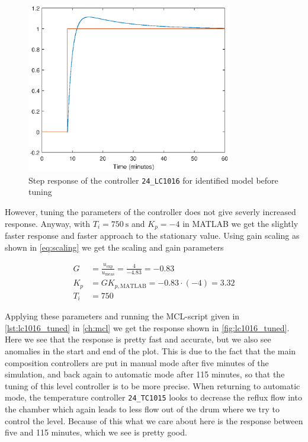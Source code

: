 \begin{figure}[ht!]
	\centering
	\includegraphics[width=0.8\textwidth]{fig/identification/lc1016_simulation_untuned.eps}
	\caption{Step response of the controller \texttt{24\_LC1016} for identified model before tuning}
	\label{fig:lc1016_untuned}
\end{figure}

However, tuning the parameters of the controller does not give severly increased response. Anyway, with $T_i = \SI{750}{\second}$ and $K_p = -4$ in MATLAB we get the slightly faster response and faster approach to the stationary value. Using gain scaling as shown in \autoref{eq:scaling} we get the scaling and gain parameters

\begin{equation}
	\begin{aligned}
		G &= \frac{u_{\text{exp}}}{u_{\text{meas}}} = \frac{4}{-4.83} = -0.83\\
		K_p &= GK_{p, \text{MATLAB}} = -0.83\cdot(-4) = 3.32\\
		T_i &= 750
	\end{aligned}
\end{equation}

Applying these parameters and running the MCL-script given in \autoref{lst:lc1016_tuned} in \autoref{ch:mcl} we get the response shown in \autoref{fig:lc1016_tuned}. Here we see that the response is pretty fast and accurate, but we also see anomalies in the start and end of the plot. This is due to the fact that the main composition controllers are put in manual mode after five minutes of the simulation, and back again to automatic mode after 115 minutes, so that the tuning of this level controller is to be more precise. When returning to automatic mode, the temperature controller \texttt{24\_TC1015} looks to decrease the reflux flow into the chamber which again leads to less flow out of the drum where we try to control the level. Because of this what we care about here is the response between five and 115 minutes, which we see is pretty good.

